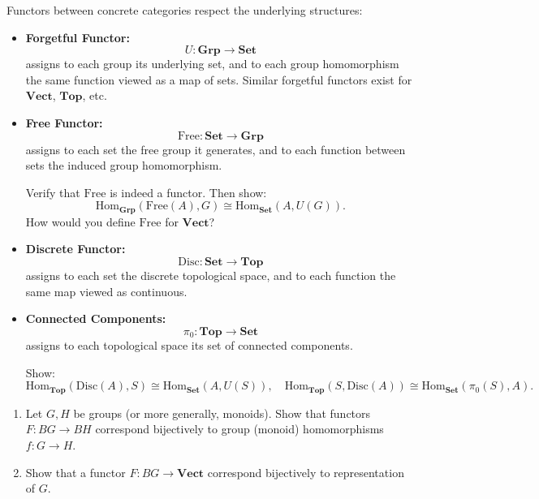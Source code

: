 \begin{example}
Functors between concrete categories respect the underlying structures:
\begin{itemize}
    \item \textbf{Forgetful Functor:}
    \[
    U: \mathbf{Grp} \to \mathbf{Set}
    \]
    assigns to each group its underlying set, and to each group homomorphism the same function viewed as a map of sets. Similar forgetful functors exist for $\mathbf{Vect}$, $\mathbf{Top}$, etc.

    \item \textbf{Free Functor:}
    \[
    \mathrm{Free}: \mathbf{Set} \to \mathbf{Grp}
    \]
    assigns to each set the free group it generates, and to each function between sets the induced group homomorphism.

    \begin{exercise}
    Verify that $\mathrm{Free}$ is indeed a functor. Then show:
    \[
    \mathrm{Hom}_{\mathbf{Grp}}(\mathrm{Free}(A), G) \cong \mathrm{Hom}_{\mathbf{Set}}(A, U(G)).
    \]
    How would you define $\mathrm{Free}$ for $\mathbf{Vect}$?
    \end{exercise}

    \item \textbf{Discrete Functor:}
    \[
    \mathrm{Disc}: \mathbf{Set} \to \mathbf{Top}
    \]
    assigns to each set the discrete topological space, and to each function the same map viewed as continuous.

    \item \textbf{Connected Components:}
    \[
    \pi_0: \mathbf{Top} \to \mathbf{Set}
    \]
    assigns to each topological space its set of connected components.

    \begin{exercise}
    Show:
    \[
    \mathrm{Hom}_{\mathbf{Top}}(\mathrm{Disc}(A), S) \cong \mathrm{Hom}_{\mathbf{Set}}(A, U(S)), \quad
    \mathrm{Hom}_{\mathbf{Top}}(S, \mathrm{Disc}(A)) \cong \mathrm{Hom}_{\mathbf{Set}}(\pi_0(S), A).
    \]
    \end{exercise}
\end{itemize}
\end{example}

\begin{exercise}
  \begin{enumerate}
    \item Let $G, H$ be groups (or more generally, monoids). Show that functors $F: BG \to BH$ correspond bijectively to group (monoid) homomorphisms $f: G \to H$.
    \item Show that a functor $F: BG\to \mathbf{Vect}$ correspond bijectively to representation of $G$.
  \end{enumerate}
\end{exercise}

